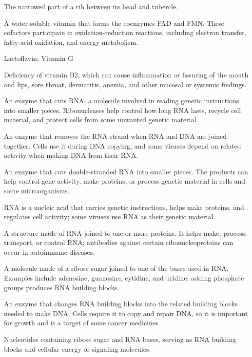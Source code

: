 The narrowed part of a rib between its head and tubercle.

 A water-soluble vitamin that forms the coenzymes FAD and FMN. These cofactors
participate in oxidation-reduction reactions, including electron transfer, fatty-acid
oxidation, and energy metabolism.

\synonyms
Lactoflavin; Vitamin G

 Deficiency of vitamin B2, which can cause inflammation or fissuring of the mouth and lips, sore throat, dermatitis, anemia, and other mucosal or systemic findings.

 An enzyme that cuts RNA, a molecule involved in reading genetic instructions, into smaller pieces. Ribonucleases help control how long RNA lasts, recycle cell material, and protect cells from some unwanted genetic material.

 An enzyme that removes the RNA strand when RNA and DNA are joined together. Cells use it during DNA copying, and some viruses depend on related activity when making DNA from their RNA.

 An enzyme that cuts double-stranded RNA into smaller pieces. The products can help control gene activity, make proteins, or process genetic material in cells and some microorganisms.

 RNA is a nucleic acid that carries genetic instructions, helps make proteins, and regulates cell activity; some viruses use RNA as their genetic material.

 A structure made of RNA joined to one or more proteins. It helps make, process, transport, or control RNA; antibodies against certain ribonucleoproteins can occur in autoimmune diseases.

 A molecule made of a ribose sugar joined to one of the bases used in RNA. Examples include adenosine, guanosine, cytidine, and uridine; adding phosphate groups produces RNA building blocks.

 An enzyme that changes RNA building blocks into the related building blocks needed to make DNA. Cells require it to copy and repair DNA, so it is important for growth and is a target of some cancer medicines.

 Nucleotides containing ribose sugar and RNA bases, serving as RNA building blocks and cellular energy or signaling molecules.


